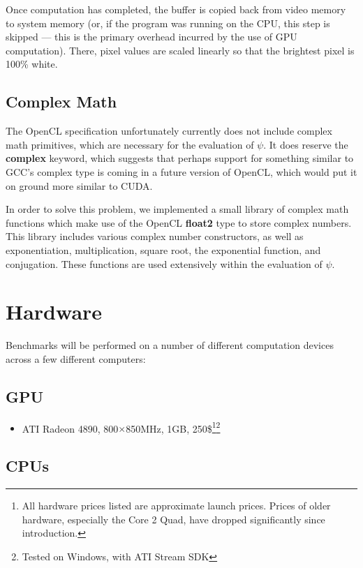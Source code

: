 \documentclass{acmsiggraph}
\begin{document}
Once computation has completed, the buffer is copied back from video memory to system memory (or, if the program was running on the CPU, this step is skipped --- this is the primary overhead incurred by the use of GPU computation). There, pixel values are scaled linearly so that the brightest pixel is 100\% white.

\subsection{Complex Math}

The OpenCL specification unfortunately currently does not include complex math primitives, which are necessary for the evaluation of $\psi$. It does reserve the {\bf complex} keyword, which suggests that perhaps support for something similar to GCC's complex type is coming in a future version of OpenCL, which would put it on ground more similar to CUDA.

In order to solve this problem, we implemented a small library of complex math functions which make use of the OpenCL {\bf float2} type to store complex numbers. This library includes various complex number constructors, as well as exponentiation, multiplication, square root, the exponential function, and conjugation. These functions are used extensively within the evaluation of $\psi$.

\section{Hardware}

Benchmarks will be performed on a number of different computation devices across a few different computers:

\subsection{GPU}

\begin{itemize}

\item ATI Radeon 4890, 800$\times$850MHz, 1GB, 250\$\footnote{All hardware prices listed are approximate launch prices. Prices of older hardware, especially the Core 2 Quad, have dropped significantly since introduction.\label{fn:prices}}\footnote{Tested on Windows, with ATI Stream SDK\label{fn:windows}}

\end{itemize}

\subsection{CPUs}
\end{document}
